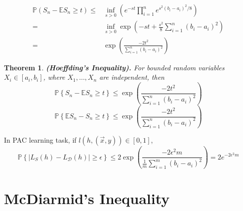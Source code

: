 \documentclass[a4paper]{article}
\newtheorem{theorem}{Theorem}
\begin{document}
\begin{align*}
    \mathbb{P}(S_n - \mathbb{E}S_n \ge t) \le& \inf_{s>0} \left( e^{-st} \prod^{n}_{i=1} e^{s^2{(b_i - a_i)}^2/8} \right)\\
    =& \inf_{s>0} \exp\left( {-st} + \frac{s^2}{8} \sum^{n}_{i=1} {{(b_i - a_i)}^2} \right)\\
    =& \exp \left( \frac{-2t^2}{\sum^{n}_{i=1} {(b_i - a_i)}^2} \right)
\end{align*}

\begin{theorem}
    \textbf{(Hoeffding's Inequality).}
    For bounded random variables $ X_i \in [a_i, b_i] $, where $ X_1, \ldots, X_n $ are independent, then
    \begin{equation}
    \mathbb{P}\left\{ S_n - \mathbb{E}S_n \ge t \right\} \le \exp \left( \frac{-2t^2}{\sum^{n}_{i=1} {(b_i - a_i)}^2}  \right)
    \end{equation}
    \begin{equation}
    \mathbb{P}\left\{ \mathbb{E}S_n - S_n \ge t \right\} \le \exp \left( \frac{-2t^2}{\sum^{n}_{i=1} {(b_i - a_i)}^2}  \right)
    \end{equation}
\end{theorem}

In PAC learning task, if $ l(h, (\vec{x}, y)) \in [0, 1] $,
\[
    \mathbb{P}\left\{ \left| L_S(h) - L_\mathcal{D}(h) \right| \ge \epsilon \right\} \le 2 \exp \left( \frac{-2\epsilon^2 m}{\frac{1}{m} \sum^{m}_{i=1} {(b_i - a_i)}^2}  \right) = 2 e^{-2\epsilon^2 m}
\]

\section{McDiarmid's Inequality}%
\label{sec:mcdiarmid_s_inequality}
\end{document}
